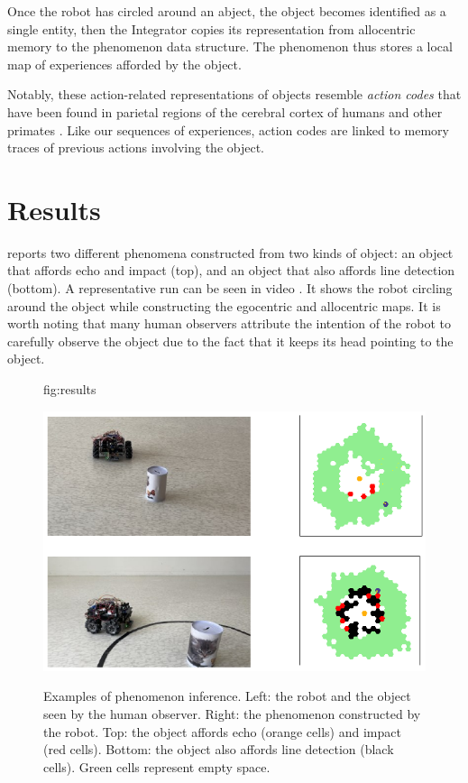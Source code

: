 \documentclass[pmlr]{jmlr}%
\begin{document}
Once the robot has circled around an abject, the object becomes identified as a single entity, then the Integrator copies its representation from allocentric memory to the phenomenon data structure.
The phenomenon thus stores a local map of experiences afforded by the object. 

Notably, these action-related representations of objects resemble \textit{action codes} that have been found in parietal regions of the cerebral cortex of humans and other primates \citep{chao_representation_2000,colby_space_1999, schubotz_objects_2014}. 
Like our sequences of experiences, action codes are linked to memory traces of previous actions involving the object.


\section{Results}

 reports two different phenomena constructed from two kinds of object: an object that affords echo and impact (top), and an object that also affords line detection (bottom).
A representative run can be seen in video \citep{titouan_knockaert_demonstration_2022}.
It shows the robot circling around the object while constructing the egocentric and allocentric maps. 
It is worth noting that many human observers attribute the intention of the robot to carefully observe the object due to the fact that it keeps its head pointing to the object. 

\begin{figure}[htbp]
	\floatconts
	{fig:results}
	{\caption{Examples of phenomenon inference.
			  Left: the robot and the object seen by the human observer.
			  Right: the phenomenon constructed by the robot. 
			  Top: the object affords echo (orange cells) and impact (red cells). 
			  Bottom: the object also affords line detection (black cells). 
			  Green cells represent empty space.}}
	{\includegraphics[width=0.6\linewidth]{images/Figure_3_results}}
\end{figure}
\end{document}
